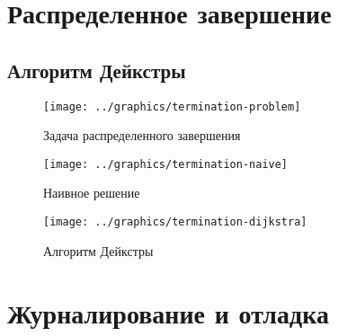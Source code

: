 \section{Распределенное завершение}
\label{sec:distributed-termination}

\subsection{Алгоритм Дейкстры}
\label{sec:distr-term-dijkstra}

\begin{figure}[ht]
  \centering
  \texttt{[image: ../graphics/termination-problem]}  
  \caption{Задача распределенного завершения}
\label{fig:termination-problem}
\end{figure}

\begin{figure}[ht]
  \centering
  \texttt{[image: ../graphics/termination-naive]}  
  \caption{Наивное решение}
\label{fig:termination-naive}
\end{figure}

\begin{figure}[ht]
  \centering
  \texttt{[image: ../graphics/termination-dijkstra]}  
  \caption{Алгоритм Дейкстры}
\label{fig:termination-dijkstra}
\end{figure}

\section{Журналирование и отладка}
\label{sec:mpi-logging}


